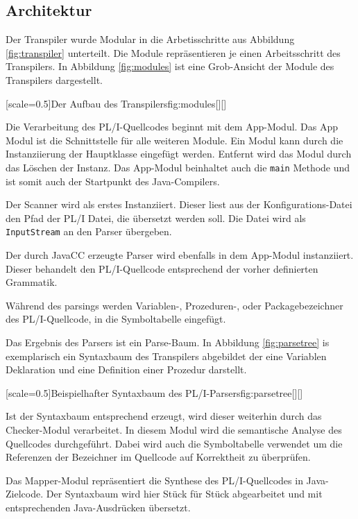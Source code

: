 \subsection{Architektur} 

Der Transpiler wurde Modular in die Arbetisschritte aus Abbildung \ref{fig:transpiler} unterteilt.
Die Module repräsentieren je einen Arbeitsschritt des Transpilers.
In Abbildung \ref{fig:modules} ist eine Grob-Ansicht der Module des Transpilers dargestellt.

[scale=0.5]{Der Aufbau des Transpilers}{fig:modules}[][]

Die Verarbeitung des PL/I-Quellcodes beginnt mit dem App-Modul. Das App Modul ist die Schnittstelle für alle weiteren Module. Ein Modul kann durch die Instanziierung der Hauptklasse eingefügt werden. Entfernt wird das Modul durch das Löschen der Instanz. Das App-Modul beinhaltet auch die \verb+main+ Methode und ist somit auch der Startpunkt des Java-Compilers.

Der Scanner wird als erstes Instanziiert. Dieser liest aus der Konfigurations-Datei den Pfad der PL/I Datei, die übersetzt werden soll. Die Datei wird als \verb+InputStream+ an den Parser übergeben.

Der durch JavaCC erzeugte Parser wird ebenfalls in dem App-Modul instanziiert. Dieser behandelt den PL/I-Quellcode entsprechend der vorher definierten Grammatik. 

Während des parsings werden Variablen-, Prozeduren-, oder Packagebezeichner des PL/I-Quellcode, in die Symboltabelle eingefügt. 

Das Ergebnis des Parsers ist ein Parse-Baum. 
In Abbildung \ref{fig:parsetree} is exemplarisch ein Syntaxbaum des Transpilers abgebildet der eine Variablen Deklaration und eine Definition einer Prozedur darstellt.

[scale=0.5]{Beispielhafter Syntaxbaum des PL/I-Parsers}{fig:parsetree}[][]

Ist der Syntaxbaum entsprechend erzeugt, wird dieser weiterhin durch das Checker-Modul verarbeitet. In diesem Modul wird die semantische Analyse des Quellcodes durchgeführt. Dabei wird auch die Symboltabelle verwendet um die Referenzen der Bezeichner im Quellcode auf Korrektheit zu überprüfen.

Das Mapper-Modul repräsentiert die Synthese des PL/I-Quellcodes in Java-Zielcode. Der Syntaxbaum wird hier Stück für Stück abgearbeitet und mit entsprechenden Java-Ausdrücken übersetzt.

